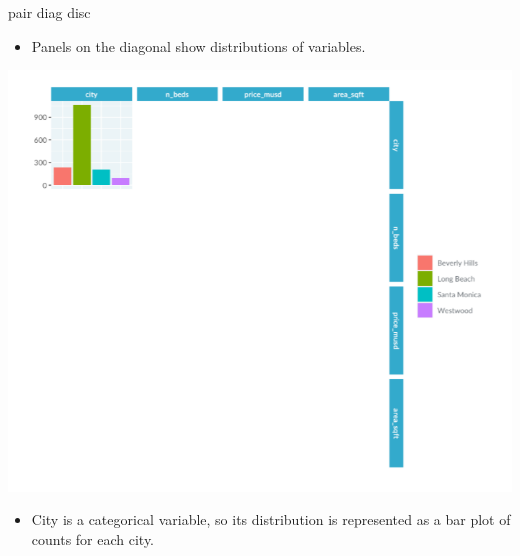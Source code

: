 \documentclass[
  ignorenonframetext,
]{beamer}
\providecommand{\tightlist}{%
  \setlength{\itemsep}{0pt}\setlength{\parskip}{0pt}}
\begin{document}
\begin{frame}{pair diag disc}
\label{pair-diag-disc}
\begin{itemize}
\tightlist
\item
  Panels on the diagonal show distributions of variables.
\end{itemize}

\includegraphics{../images/im90.png}

\begin{itemize}
\tightlist
\item
  City is a categorical variable, so its distribution is represented as
  a bar plot of counts for each city.
\end{itemize}
\end{frame}
\end{document}
